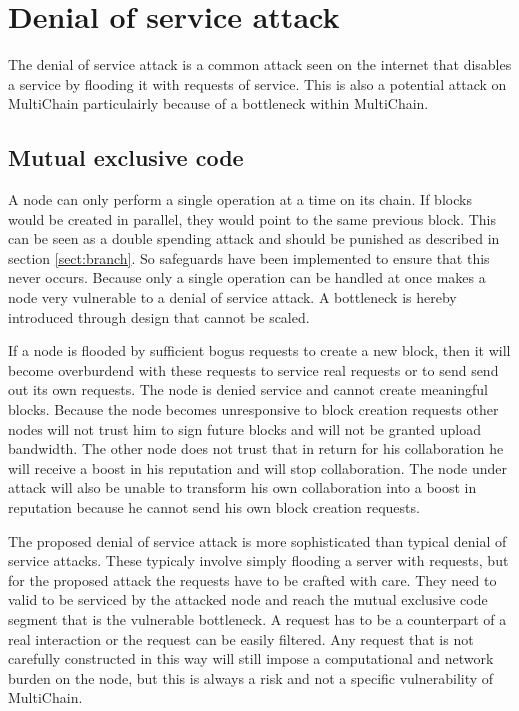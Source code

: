 \section{Denial of service attack}
\label{sect:denial}
The denial of service attack is a common attack seen on the internet
that disables a service by flooding it with requests of service.
This is also a potential attack on MultiChain particulairly because of a bottleneck within MultiChain.

\subsection{Mutual exclusive code}
A node can only perform a single operation at a time on its chain.
If blocks would be created in parallel, they would point to the same previous block.
This can be seen as a double spending attack and should be punished as described in section \ref{sect:branch}.
So safeguards have been implemented to ensure that this never occurs.
Because only a single operation can be handled at once
makes a node very vulnerable to a denial of service attack.
A bottleneck is hereby introduced through design that cannot be scaled.

If a node is flooded by sufficient bogus requests to create a new block,
then it will become overburdend with these requests to service real requests or to send send out its own requests.
The node is denied service and cannot create meaningful blocks.
Because the node becomes unresponsive to block creation requests other nodes will not trust him to sign future blocks
and will not be granted upload bandwidth.
The other node does not trust that in return for his collaboration he will receive a boost in his reputation
and will stop collaboration.
The node under attack will also be unable to transform his own collaboration into a boost in reputation
because he cannot send his own block creation requests.

The proposed denial of service attack is more sophisticated than typical denial of service attacks.
These typicaly involve simply flooding a server with requests,
but for the proposed attack the requests have to be crafted with care.
They need to valid to be serviced by the attacked node and reach the mutual exclusive code segment
that is the vulnerable bottleneck.
A request has to be a counterpart of a real interaction or the request can be easily filtered.
Any request that is not carefully constructed in this way
will still impose a computational and network burden on the node,
but this is always a risk and not a specific vulnerability of MultiChain.

